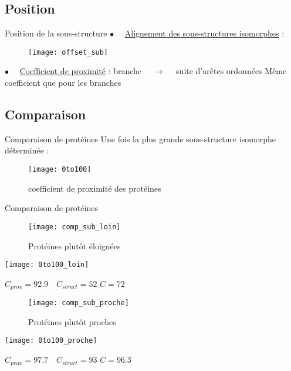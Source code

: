 \subsection{Position}
\begin{frame}{Position de la sous-structure}
    $\bullet \quad$ \underline{Alignement des sous-structures isomorphes} :
    \begin{figure}[!htb]
        \centering
        \texttt{[image: offset\_sub]}
    \end{figure}
    $\bullet \quad$ \underline{Coefficient de proximité} : \newline \newline
    branche $\quad \rightarrow \quad$ suite d'arêtes ordonnées \newline
    Même coefficient que pour les branches
\end{frame}

\subsection{Comparaison}
\begin{frame}{Comparaison de protéines}
    Une fois la plus grande sous-structure isomorphe déterminée : 
    \begin{figure}[!htb]
        \centering
        \texttt{[image: 0to100]}
        \caption{\label{fig:0to100} coefficient de proximité des protéines}
    \end{figure}
\end{frame}

\begin{frame}{Comparaison de protéines}
    \begin{multicols}{2}
        \begin{figure}[!htb]
            \centering
            \texttt{[image: comp\_sub\_loin]}
            \caption{\label{fig: subcomp_loin} Protéines plutôt éloignées}
        \end{figure}
        \texttt{[image: 0to100\_loin]}
        \begin{center}
            $C_{prox}=92.9 \quad C_{struct}=52$\newline \newline
            $\boxed{C=72}$
        \end{center}
    \end{multicols}
    \begin{multicols}{2}
        \begin{figure}[!htb]
            \centering
            \texttt{[image: comp\_sub\_proche]}
            \caption{\label{fig: subcom_proche} Protéines plutôt proches}
        \end{figure}
        \texttt{[image: 0to100\_proche]}
        \begin{center}
            $C_{prox}=97.7 \quad C_{struct}=93$\newline \newline
            $\boxed{C=96.3}$
        \end{center}
    \end{multicols}
\end{frame}

